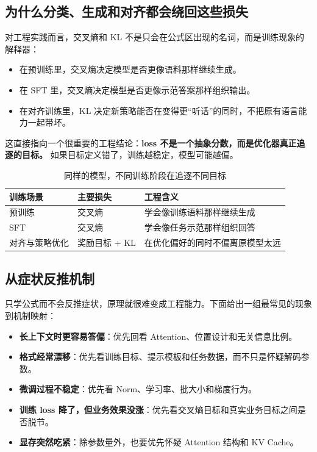 \subsection{为什么分类、生成和对齐都会绕回这些损失}
对工程实践而言，交叉熵和 KL 不是只会在公式区出现的名词，而是训练现象的解释器：
\begin{itemize}
  \item 在预训练里，交叉熵决定模型是否更像语料那样继续生成。
  \item 在 SFT 里，交叉熵决定模型是否更像示范答案那样组织输出。
  \item 在对齐训练里，KL 决定新策略能否在变得更“听话”的同时，不把原有语言能力一起带坏。
\end{itemize}

这直接指向一个很重要的工程结论：\textbf{loss 不是一个抽象分数，而是优化器真正追逐的目标。} 如果目标定义错了，训练越稳定，模型可能越偏。

\begin{table}[H]
\centering
\small
\begin{tabularx}{\textwidth}{>{\raggedright\arraybackslash}p{2.7cm}>{\raggedright\arraybackslash}p{3.1cm}>{\raggedright\arraybackslash}X}
\toprule
\textbf{训练场景} & \textbf{主要损失} & \textbf{工程含义} \\
\midrule
预训练 & 交叉熵 & 学会像训练语料那样继续生成 \\
SFT & 交叉熵 & 学会像任务示范那样组织回答 \\
对齐与策略优化 & 奖励目标 + KL & 在优化偏好的同时不偏离原模型太远 \\
\bottomrule
\end{tabularx}
\caption{同样的模型，不同训练阶段在追逐不同目标}
\label{tab:loss-roles}
\end{table}

\subsection{从症状反推机制}
只学公式而不会反推症状，原理就很难变成工程能力。下面给出一组最常见的现象到机制映射：
\begin{itemize}
  \item \textbf{长上下文时更容易答偏}：优先回看 Attention、位置设计和无关信息比例。
  \item \textbf{格式经常漂移}：优先看训练目标、提示模板和任务数据，而不只是怀疑解码参数。
  \item \textbf{微调过程不稳定}：优先看 Norm、学习率、批大小和梯度行为。
  \item \textbf{训练 loss 降了，但业务效果没涨}：优先看交叉熵目标和真实业务目标之间是否脱节。
  \item \textbf{显存突然吃紧}：除参数量外，也要优先怀疑 Attention 结构和 KV Cache。
\end{itemize}

